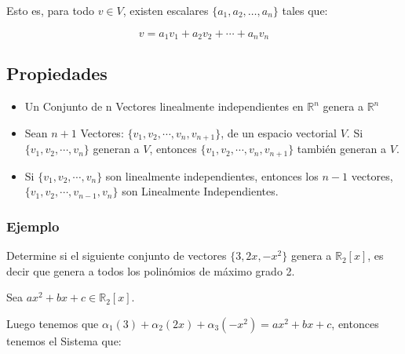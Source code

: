 \documentclass[12pt]{report}							    %
\begin{document}
        Esto es, para todo $v \in V$, existen escalares $\{a_1,a_2,\dots,a_n\}$ tales que:

        \begin{equation}
            v = a_1v_1 + a_2v_2 + \cdots + a_nv_n
        \end{equation}


        \subsection{Propiedades}
        \begin{itemize}
            \item Un Conjunto de n Vectores linealmente independientes en
            $\mathbb{R}^n$ genera a $\mathbb{R}^n$

            \item Sean $n+1$ Vectores: $\{ v_1, v_2, \cdots, v_n, v_{n+1} \}$, 
            de un espacio vectorial $V$. Si $\{ v_1, v_2, \cdots, v_n \}$ generan a $V$,
            entonces $\{ v_1, v_2, \cdots, v_n, v_{n+1} \}$ también generan a $V$.

            \item Si $\{ v_1, v_2, \cdots, v_n \}$ son linealmente independientes,
            entonces los $n-1$ vectores, $\{v_1, v_2, \cdots, v_{n-1}, v_n \}$ son
            Linealmente Independientes.

        \end{itemize}


            \subsubsection{Ejemplo}
            Determine si el siguiente conjunto de vectores $\{ 3, 2x, -x^2\}$ genera
            a $\mathbb{R}_2 [x]$, es decir que genera a todos los
            polinómios de máximo grado 2.

            Sea $ax^2 + bx +c \in \mathbb{R}_2 [x]$.

            Luego tenemos que
            $\alpha_1 (3) + \alpha_2 (2x) + \alpha_3 (-x^2) = ax^2 + bx +c$,
            entonces tenemos el Sistema que:
\end{document}
